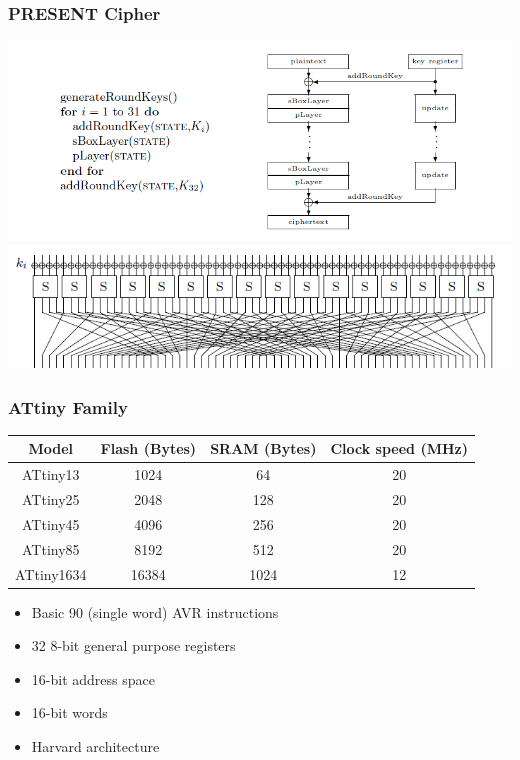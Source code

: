 \documentclass{beamer}
\begin{document}

\begin{frame}[fragile]
\frametitle{PRESENT Cipher}
\includegraphics[width=\textwidth]{cipher} \\
\includegraphics[width=\textwidth]{spnet.png}
\end{frame}

\begin{frame}[fragile]
\frametitle{ATtiny Family}
\begin{tabular}{|c | c c c|}
	\hline
        Model & Flash (Bytes) & SRAM (Bytes) & Clock speed (MHz) \\
	\hline
ATtiny13 & 1024 & 64 & 20 \\
	\hline
ATtiny25 & 2048 & 128 & 20 \\
	\hline
\rowcolor{yellow}
ATtiny45 & 4096 & 256 & 20 \\
	\hline
ATtiny85 & 8192 & 512 & 20 \\
	\hline
ATtiny1634 & 16384 & 1024 & 12 \\
	\hline
\end{tabular}

\begin{itemize}
\item Basic 90 (single word) AVR instructions
\item 32 8-bit general purpose registers
\item 16-bit address space
\item 16-bit words
\item Harvard architecture
\end{itemize}
\end{frame}
\end{document}
